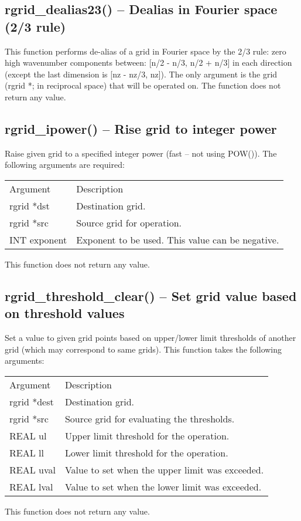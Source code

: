 \documentclass[12pt,letterpaper]{report}
\begin{document}
\subsection{rgrid\_dealias23() -- Dealias in Fourier space (2/3 rule)}

This function performs de-alias of a grid in Fourier space by the 2/3 rule: zero high wavenumber components between: [n/2 - n/3, n/2 + n/3] in each direction (except the last dimension is [nz - nz/3, nz]). The only argument is the grid (rgrid *; in reciprocal space) that will be operated on. The function does not return any value.

\subsection{rgrid\_ipower() -- Rise grid to integer power}

Raise given grid to a specified integer power (fast -- not using POW()). The following arguments are required:
\begin{longtable}{p{} p{}}
Argument & Description\\
\cline{1-2}
rgrid *dst & Destination grid.\\
rgrid *src & Source grid for operation.\\
INT exponent & Exponent to be used. This value can be negative.\\
\end{longtable}
\noindent
This function does not return any value. 

\subsection{rgrid\_threshold\_clear() -- Set grid value based on threshold values}

Set a value to given grid points based on upper/lower limit thresholds of another grid (which may correspond to same grids). This function takes the following arguments:
\begin{longtable}{p{} p{}}
Argument & Description\\
\cline{1-2}
rgrid *dest & Destination grid.\\
rgrid *src  & Source grid for evaluating the thresholds.\\
REAL ul & Upper limit threshold for the operation.\\
REAL ll & Lower limit threshold for the operation.\\
REAL uval & Value to set when the upper limit was exceeded.\\
REAL lval & Value to set when the lower limit was exceeded.\\
\end{longtable}
\noindent
This function does not return any value. 
\end{document}
